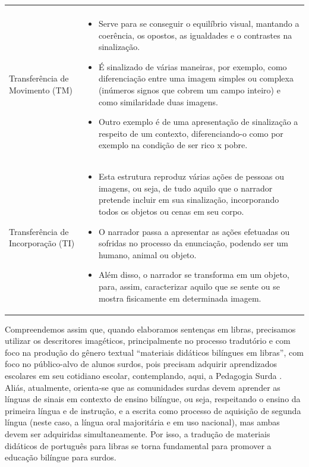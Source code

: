 \documentclass[portuguese]{textolivre}
\begin{document}
\begin{table}[htbp]
\begin{tabular}{p{4cm} p{10cm}}
\begin{itemize}
\end{itemize} \\
Transferência de Movimento (TM) & 
\begin{itemize}\vspace{-7pt}
    \item Serve para se conseguir o equilíbrio visual, mantando a coerência, os opostos, as igualdades e o contrastes na sinalização.
    \item É sinalizado de várias maneiras, por exemplo, como diferenciação entre uma imagem simples ou complexa (inúmeros signos que cobrem um campo inteiro) e como similaridade duas imagens. 
    \item Outro exemplo é de uma apresentação de sinalização a respeito de um contexto, diferenciando-o como por exemplo na condição de ser rico x pobre.
\end{itemize} \\
Transferência de Incorporação (TI) & 
\begin{itemize}\vspace{-7pt}
    \item Esta estrutura reproduz várias ações de pessoas ou imagens, ou seja, de tudo aquilo que o narrador pretende incluir em sua sinalização, incorporando todos os objetos ou cenas em seu corpo. 
    \item O narrador passa a apresentar as ações efetuadas ou sofridas no processo da enunciação, podendo ser um humano, animal ou objeto. 
    \item Além disso, o narrador se transforma em um objeto, para, assim, caracterizar aquilo que se sente ou se mostra fisicamente em determinada imagem.
\end{itemize} \\
\bottomrule
\end{tabular}
\end{table}

Compreendemos assim que, quando elaboramos sentenças em libras, precisamos utilizar os descritores imagéticos, principalmente no processo tradutório e com foco na produção do gênero textual “materiais didáticos bilíngues em libras”, com foco no público-alvo de alunos surdos, pois precisam adquirir aprendizados escolares em seu cotidiano escolar, contemplando, aqui, a Pedagogia Surda \cite{lemos2021pedagogia}. Aliás, atualmente, orienta-se que as comunidades surdas devem aprender as línguas de sinais em contexto de ensino bilíngue, ou seja, respeitando o ensino da primeira língua e de instrução, e a escrita como processo de aquisição de segunda língua (neste caso, a língua oral majoritária e em uso nacional), mas ambas devem ser adquiridas simultaneamente. Por isso, a tradução de materiais didáticos de português para libras se torna fundamental para promover a educação bilíngue para surdos.
\end{document}
